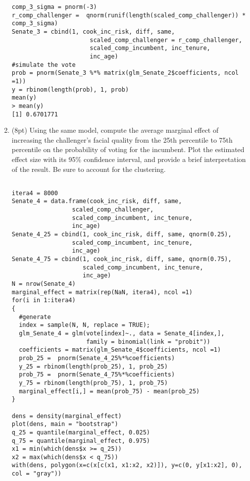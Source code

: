 \documentclass[11pt,english]{article}
\begin{document}
\begin{enumerate}
\begin{verbatim}
comp_3_sigma = pnorm(-3)
r_comp_challenger =  qnorm(runif(length(scaled_comp_challenger)) * comp_3_sigma)
Senate_3 = cbind(1, cook_inc_risk, diff, same,
                      scaled_comp_challenger = r_comp_challenger,
                      scaled_comp_incumbent, inc_tenure,
                      inc_age)
#simulate the vote
prob = pnorm(Senate_3 %*% matrix(glm_Senate_2$coefficients, ncol =1))
y = rbinom(length(prob), 1, prob)
mean(y)
> mean(y)
[1] 0.6701771
\end{verbatim}



\item (8pt) Using the same model, compute the average marginal effect of
increasing the challenger's facial quality from the 25th percentile
to 75th percentile on the probability of voting for the incumbent.
Plot the estimated effect size with its 95\% confidence interval,
and provide a brief interpretation of the result. Be sure to account for the clustering.

\begin{verbatim}

itera4 = 8000
Senate_4 = data.frame(cook_inc_risk, diff, same,
                 scaled_comp_challenger,
                 scaled_comp_incumbent, inc_tenure,
                 inc_age)
Senate_4_25 = cbind(1, cook_inc_risk, diff, same, qnorm(0.25),
                 scaled_comp_incumbent, inc_tenure,
                 inc_age)
Senate_4_75 = cbind(1, cook_inc_risk, diff, same, qnorm(0.75),
                    scaled_comp_incumbent, inc_tenure,
                    inc_age)
N = nrow(Senate_4)
marginal_effect = matrix(rep(NaN, itera4), ncol =1)
for(i in 1:itera4)
{
  #generate
  index = sample(N, N, replace = TRUE);
  glm_Senate_4 = glm(vote[index]~., data = Senate_4[index,],
                     family = binomial(link = "probit"))
  coefficients = matrix(glm_Senate_4$coefficients, ncol =1)
  prob_25 =  pnorm(Senate_4_25%*%coefficients)
  y_25 = rbinom(length(prob_25), 1, prob_25)
  prob_75 =  pnorm(Senate_4_75%*%coefficients)
  y_75 = rbinom(length(prob_75), 1, prob_75)
  marginal_effect[i,] = mean(prob_75) - mean(prob_25)
}

dens = density(marginal_effect)
plot(dens, main = "bootstrap")
q_25 = quantile(marginal_effect, 0.025)
q_75 = quantile(marginal_effect, 0.975)
x1 = min(which(dens$x >= q_25))
x2 = max(which(dens$x < q_75))
with(dens, polygon(x=c(x[c(x1, x1:x2, x2)]), y=c(0, y[x1:x2], 0), col = "gray"))



\end{verbatim}
\end{enumerate}
\end{document}
